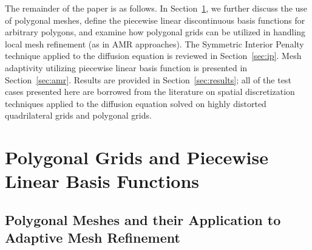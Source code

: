 \documentclass[preprint,10pt]{elsarticle}
\newcommand{\sct}[1]{Section~\ref{#1}}                   %
\begin{document}

The remainder of the paper is as follows. In \sct{sec:poly}, we further discuss
the use of polygonal meshes, define the piecewise linear discontinuous 
basis functions for arbitrary polygons, and examine how polygonal grids
can be utilized in handling local mesh refinement (as in AMR 
approaches). The Symmetric Interior Penalty technique applied to the diffusion 
equation is reviewed in \sct{sec:ip}.
Mesh adaptivity utilizing piecewise linear basis function is presented in 
\sct{sec:amr}. Results are provided in \sct{sec:results}; all of the test cases presented here 
are borrowed from the literature on spatial discretization techniques applied to 
the diffusion equation solved on highly distorted quadrilateral grids and polygonal grids.

\section{Polygonal Grids and Piecewise Linear Basis Functions} \label{sec:poly}
\subsection{Polygonal Meshes and their Application to Adaptive Mesh Refinement}
\end{document}
